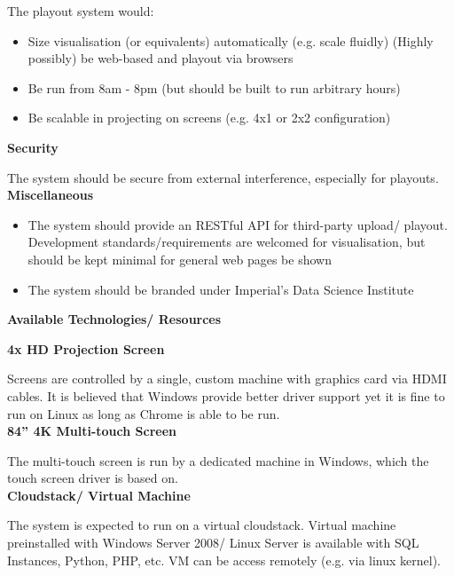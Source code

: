 \documentclass[a4paper, titlepage]{article}
\begin{document}
The playout system would:

\begin{itemize}
\item Size visualisation (or equivalents) automatically (e.g. scale fluidly) (Highly possibly) be web-based and playout via browsers
\item Be run from 8am - 8pm (but should be built to run arbitrary hours)
\item Be scalable in projecting on screens (e.g. 4x1 or 2x2 configuration)\\
\end{itemize}

\textbf{\large Security}

The system should be secure from external interference, especially for playouts.\\

\textbf{\large Miscellaneous}

\begin{itemize}
\item The system should provide an RESTful API for third-party upload/ playout.
Development standards/requirements are welcomed for visualisation, but should be kept minimal for general web pages be shown
\item The system should be branded under Imperial’s Data Science Institute\\
\end{itemize}


\textbf{\Large Available Technologies/ Resources} \vspace{5pt}

\textbf{\large 4x HD Projection Screen}

Screens are controlled by a single, custom machine with graphics card via HDMI cables. It is believed that Windows provide better driver support yet it is fine to run on Linux as long as Chrome is able to be run.\\

\textbf{\large 84” 4K Multi-touch Screen}

The multi-touch screen is run by a dedicated machine in Windows, which the touch screen driver is based on.\\

\textbf{\large Cloudstack/ Virtual Machine}

The system is expected to run on a virtual cloudstack. Virtual machine preinstalled with Windows Server 2008/ Linux Server is available with SQL Instances, Python, PHP, etc. VM can be access remotely (e.g. via linux kernel).\\
\end{document}
